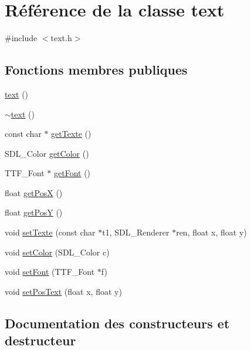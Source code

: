 \hypertarget{classtext}{}\section{Référence de la classe text}
\label{classtext}


{\ttfamily \#include $<$text.\+h$>$}

\subsection*{Fonctions membres publiques}
\begin{DoxyCompactItemize}
\item 
\hyperlink{classtext_a14339f5c8f5e1fb023f0e68bf5685247}{text} ()
\item 
\hyperlink{classtext_af8ef97c73999b22520a93bad9df8cb66}{$\sim$text} ()
\item 
const char $\ast$ \hyperlink{classtext_a19bae9196167cac1f70b3bcde0fe0f26}{get\+Texte} ()
\item 
S\+D\+L\+\_\+\+Color \hyperlink{classtext_a95c99a1931e9fa63969c8b42f836b215}{get\+Color} ()
\item 
T\+T\+F\+\_\+\+Font $\ast$ \hyperlink{classtext_ae2dd2d35f124bcb078c1d02071b1a370}{get\+Font} ()
\item 
float \hyperlink{classtext_a8e8c502e3081ab9eb694e2e328db0bbd}{get\+PosX} ()
\item 
float \hyperlink{classtext_a902fc45d94c7695744627c2bf69d08b2}{get\+PosY} ()
\item 
void \hyperlink{classtext_a397b0dee4c2d203b5452fd5120b50c1b}{set\+Texte} (const char $\ast$t1, S\+D\+L\+\_\+\+Renderer $\ast$ren, float x, float y)
\item 
void \hyperlink{classtext_aa7224cdb0c4b84333f99cb8b16e203dc}{set\+Color} (S\+D\+L\+\_\+\+Color c)
\item 
void \hyperlink{classtext_a888a5a6195a5f0ec7fbffc358e9ec9d8}{set\+Font} (T\+T\+F\+\_\+\+Font $\ast$f)
\item 
void \hyperlink{classtext_a41777eee397fd87e5f743fce5e2ba83b}{set\+Pos\+Text} (float x, float y)
\end{DoxyCompactItemize}


\subsection{Documentation des constructeurs et destructeur}
\mbox{\label{classtext_a14339f5c8f5e1fb023f0e68bf5685247}} 
